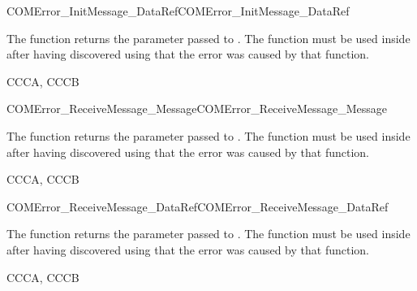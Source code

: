 \begin{function_nopb2}{COMError\_InitMessage\_DataRef}{COMError_InitMessage_DataRef}
  \begin{fundescription}
    The function returns the  parameter passed to
    . The function must be used inside  
     after having discovered using  that the error 
     was caused by that function.
  \end{fundescription}
  \begin{funreturn}
  \end{funreturn}
  \begin{funconformance}
   CCCA, CCCB
  \end{funconformance}
\end{function_nopb2}

\begin{function_nopb2}{COMError\_ReceiveMessage\_Message}{COMError_ReceiveMessage_Message}
  \begin{fundescription}
    The function returns the  parameter passed to
    . The function must be used inside  
     after having discovered using  that the error 
     was caused by that function.
  \end{fundescription}
  \begin{funreturn}
  \end{funreturn}
  \begin{funconformance}
   CCCA, CCCB
  \end{funconformance}
\end{function_nopb2}

\begin{function_nopb2}{COMError\_ReceiveMessage\_DataRef}{COMError_ReceiveMessage_DataRef}
  \begin{fundescription}
    The function returns the  parameter passed to
    . The function must be used inside  
     after having discovered using  that the error 
     was caused by that function.
  \end{fundescription}
  \begin{funreturn}
  \end{funreturn}
  \begin{funconformance}
   CCCA, CCCB
  \end{funconformance}
\end{function_nopb2}

